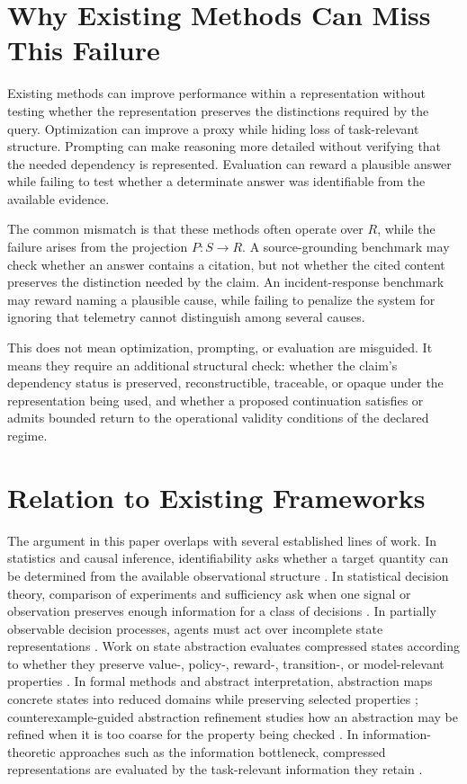 \documentclass[11pt]{article}
\begin{document}
\section{Why Existing Methods Can Miss This Failure}

Existing methods can improve performance within a representation without testing whether the representation preserves the distinctions required by the query. Optimization can improve a proxy while hiding loss of task-relevant structure. Prompting can make reasoning more detailed without verifying that the needed dependency is represented. Evaluation can reward a plausible answer while failing to test whether a determinate answer was identifiable from the available evidence.

The common mismatch is that these methods often operate over $R$, while the failure arises from the projection $P:S\rightarrow R$. A source-grounding benchmark may check whether an answer contains a citation, but not whether the cited content preserves the distinction needed by the claim. An incident-response benchmark may reward naming a plausible cause, while failing to penalize the system for ignoring that telemetry cannot distinguish among several causes.

This does not mean optimization, prompting, or evaluation are misguided. It means they require an additional structural check: whether the claim's dependency status is preserved, reconstructible, traceable, or opaque under the representation being used, and whether a proposed continuation satisfies or admits bounded return to the operational validity conditions of the declared regime.

\section{Relation to Existing Frameworks}

The argument in this paper overlaps with several established lines of work. In statistics and causal inference, identifiability asks whether a target quantity can be determined from the available observational structure \cite{Pearl2009}. In statistical decision theory, comparison of experiments and sufficiency ask when one signal or observation preserves enough information for a class of decisions \cite{Blackwell1953}. In partially observable decision processes, agents must act over incomplete state representations \cite{Kaelbling1998}. Work on state abstraction evaluates compressed states according to whether they preserve value-, policy-, reward-, transition-, or model-relevant properties \cite{Li2006}. In formal methods and abstract interpretation, abstraction maps concrete states into reduced domains while preserving selected properties \cite{Cousot1977}; counterexample-guided abstraction refinement studies how an abstraction may be refined when it is too coarse for the property being checked \cite{Clarke2000}. In information-theoretic approaches such as the information bottleneck, compressed representations are evaluated by the task-relevant information they retain \cite{Tishby1999}.
\end{document}
